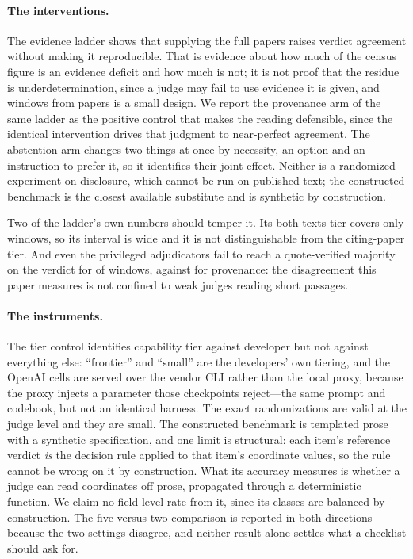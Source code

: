 \documentclass[11pt]{article}
\begin{document}
\paragraph{The interventions.}
The evidence ladder shows that supplying the full papers raises verdict
agreement without making it reproducible. That is evidence about how much of the
census figure is an evidence deficit and how much is not; it is not proof that
the residue is underdetermination, since a judge may fail to use evidence it is
given, and \PrivN{} windows from \PrivPapers{} papers is a small design. We
report the provenance arm of the same ladder as the positive control that makes
the reading defensible, since the identical intervention drives that judgment to
near-perfect agreement. The abstention arm changes two things at once by
necessity, an option and an instruction to prefer it, so it identifies their
joint effect. Neither is a randomized experiment on disclosure, which cannot be
run on published text; the constructed benchmark is the closest available
substitute and is synthetic by construction.

Two of the ladder's own numbers should temper it. Its both-texts tier covers
only \PrivBoth{} windows, so its interval is wide and it is not distinguishable
from the citing-paper tier. And even the privileged adjudicators fail to reach a
quote-verified majority on the verdict for \RefVdNoMaj{} of \PrivN{} windows,
against \RefPvNoMaj{} for provenance: the disagreement this paper measures is
not confined to weak judges reading short passages.

\paragraph{The instruments.}
The tier control identifies capability tier against developer but not against
everything else: ``frontier'' and ``small'' are the developers' own tiering, and
the OpenAI cells are served over the vendor CLI rather than the local proxy,
because the proxy injects a parameter those checkpoints reject---the same prompt
and codebook, but not an identical harness. The exact randomizations are valid
at the judge level and they are small. The constructed benchmark is templated
prose with a synthetic specification, and one limit is structural: each item's
reference verdict \emph{is} the decision rule applied to that item's coordinate
values, so the rule cannot be wrong on it by construction. What its accuracy
measures is whether a judge can read coordinates off prose, propagated through a
deterministic function. We claim no field-level rate from it, since its classes
are balanced by construction. The five-versus-two comparison is reported in both
directions because the two settings disagree, and neither result alone settles
what a checklist should ask for.
\end{document}
